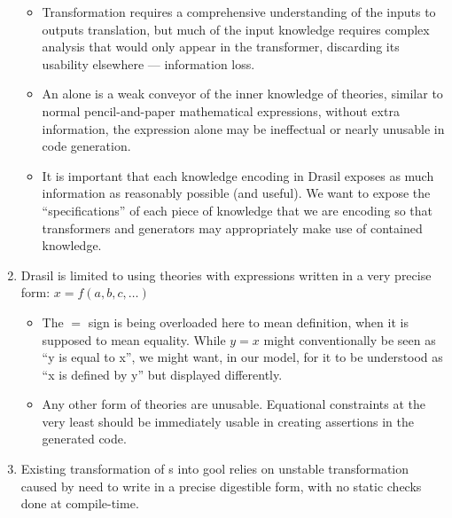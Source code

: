 \begin{enumerate}
\begin{itemize}
		      \item Transformation requires a comprehensive understanding of the
		            inputs to outputs translation, but much of the input
		            knowledge requires complex analysis that would only appear
		            in the transformer, discarding its usability elsewhere —
		            information loss.

		      \item An \Expr{} alone is a weak conveyor of the inner knowledge
		            of theories, similar to normal pencil-and-paper mathematical
		            expressions, without extra information, the expression alone
		            may be ineffectual or nearly unusable in code generation.

		      \item It is important that each knowledge encoding in Drasil
		            exposes as much information as reasonably possible (and
		            useful). We want to expose the ``specifications'' of each
		            piece of knowledge that we are encoding so that transformers
		            and generators may appropriately make use of contained
		            knowledge.

	      \end{itemize}

	\item Drasil is limited to using theories with expressions written in a very
	      precise form: \(x = f(a, b, c, \ldots{})\) 

	      \begin{itemize}

		      \item The \(=\) sign is being overloaded here to mean definition,
		            when it is supposed to mean equality. While \(y = x\) might
		            conventionally be seen as ``y is equal to x'', we might
		            want, in our model, for it to be understood as ``x is
		            defined by y'' but displayed differently.

		      \item Any other form of theories are unusable. Equational
		            constraints at the very least should be immediately usable
		            in creating assertions in the generated code.

	      \end{itemize}

	\item Existing transformation of \RelationConcept{}s into \acs{gool} relies
	      on unstable transformation caused by need to write in a precise
	      digestible form, with no static checks done at compile-time.

\end{enumerate}

